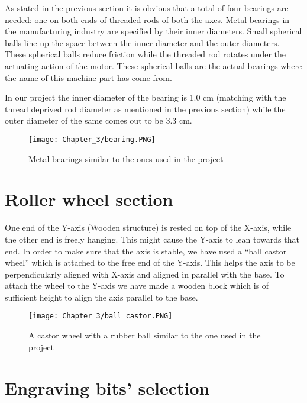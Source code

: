 As stated in the previous section it is obvious that a total of four bearings are needed: one on both ends of threaded rods of both the axes. Metal bearings in the manufacturing industry are specified by their inner diameters. Small spherical balls line up the space between the inner diameter and the outer diameters. These spherical balls reduce friction while the threaded rod rotates under the actuating action of the motor. These spherical balls are the actual bearings where the name of this machine part has come from. \par

In our project the inner diameter of the bearing is 1.0 cm (matching with the thread deprived rod diameter as mentioned in the previous section) while the outer diameter of the same comes out to be 3.3 cm. 

\begin{figure}[h]
    \centering
    \texttt{[image: Chapter\_3/bearing.PNG]}
    \caption{Metal bearings similar to the ones used in the project}
    \label{fig:bearing}
\end{figure}

\section{Roller wheel section}

One end of the Y-axis (Wooden structure) is rested on top of the X-axis, while the other end is freely hanging. This might cause the Y-axis to lean towards that end. In order to make sure that the axis is stable, we have used a “ball castor wheel” which is attached to the free end of the Y-axis. This helps the axis to be perpendicularly aligned with X-axis and aligned in parallel with the base. To attach the wheel to the Y-axis we have made a wooden block which is of sufficient height to align the axis parallel to the base.

\begin{figure}[h]
    \centering
    \texttt{[image: Chapter\_3/ball\_castor.PNG]}
    \caption{A castor wheel with a rubber ball similar to the one used in the project}
    \label{fig:ballcastor}
\end{figure}

\section{Engraving bits' selection}

